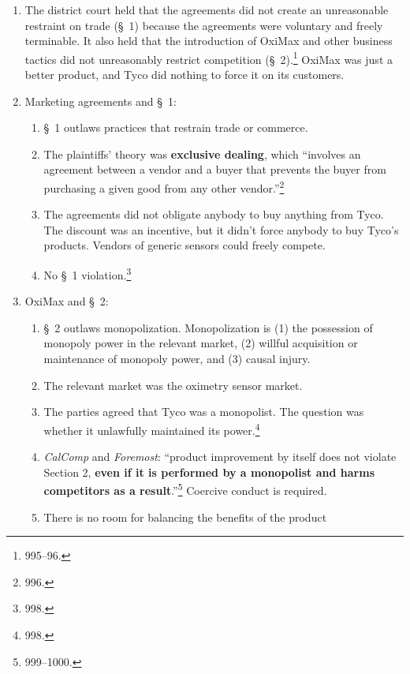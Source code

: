 \begin{enumerate}
    violated \S\S\ 1 and 2 of the Sherman Act.\footnote{995--96.}
    \item The district court held that the agreements did not create an 
    unreasonable restraint on trade (\S\ 1) because the agreements were 
    voluntary and freely terminable. It also held that the introduction of 
    OxiMax and other business tactics did not unreasonably restrict 
    competition (\S\ 2).\footnote{995--96.} OxiMax was just a better product, 
    and Tyco did nothing to force it on its customers.
    \item Marketing agreements and \S\ 1:
    \begin{enumerate}
        \item \S\ 1 outlaws practices that restrain trade or commerce.
        \item The plaintiffs' theory was \textbf{exclusive dealing}, which 
        ``involves an agreement between a vendor and a buyer that prevents the 
        buyer from purchasing a given good from any other 
        vendor.''\footnote{996.}
        \item The agreements did not obligate anybody to buy anything from 
        Tyco. The discount was an incentive, but it didn't force anybody to 
        buy Tyco's products. Vendors of generic sensors could freely compete.
        \item No \S\ 1 violation.\footnote{998.}
    \end{enumerate}
    \item OxiMax and \S\ 2:
    \begin{enumerate}
        \item \S\ 2 outlaws monopolization. Monopolization is (1) the 
        possession of monopoly power in the relevant market, (2) willful 
        acquisition or maintenance of monopoly power, and (3) causal injury.
        \item The relevant market was the oximetry sensor market.
        \item The parties agreed that Tyco was a monopolist. The question was 
        whether it unlawfully maintained its power.\footnote{998.}
        \item \emph{CalComp} and \emph{Foremost}: ``product improvement by 
        itself does not violate Section 2, \textbf{even if it is performed by 
        a monopolist and harms competitors as a 
        result}.''\footnote{999--1000.} Coercive conduct is required.
        \item There is no room for balancing the benefits of the product 

\end{enumerate}
\end{enumerate}
